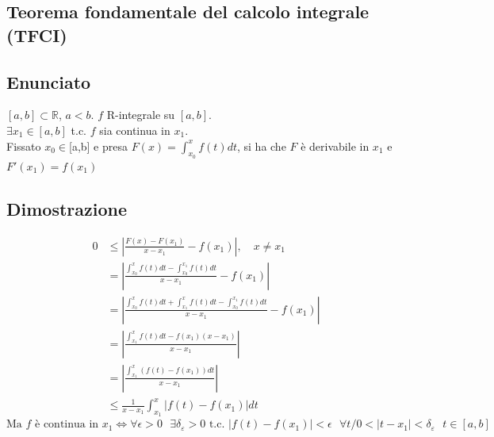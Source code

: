 \documentclass{article}
\newcommand{\R}{\mathbb{R}}
\newcommand{\DeltaEp}{\delta_{\varepsilon}} %
\newcommand{\vSpace}{\vspace{1em}}
\begin{document}
\begin{flushleft}
\section{Teorema fondamentale del calcolo integrale (TFCI)} \label{TFCI}
\subsection{Enunciato}
$[a,b] \subset \R$, $a < b$. $f$ R-integrale su $[a,b]$.
\\$\exists x_1 \in [a,b]$ t.c. $f$ sia continua in $x_1$.
\\Fissato $x_0 \in $[a,b] e presa $F(x) = \int_{x_0}^{x}f(t)dt$, si ha che $F$ è derivabile in $x_1$ e $F'(x_1)=f(x_1)$
\subsection{Dimostrazione}

\begin{align*}
    0 &\leq \left| \frac{F(x) - F(x_1)}{x - x_1} - f(x_1) \right|, \quad x \neq x_1 \\
    &= \left| \frac{\int_{x_0}^{x} f(t) dt - \int_{x_0}^{x_1} f(t) dt}{x - x_1} - f(x_1) \right| \\
    &= \left| \frac{\int_{x_0}^{x} f(t) dt + \int_{x_1}^{x} f(t) dt - \int_{x_0}^{x_1} f(t) dt}{x - x_1} - f(x_1) \right| \\
    &= \left| \frac{\int_{x_1}^{x} f(t) dt - f(x_1)(x - x_1)}{x - x_1} \right| \\
    &= \left| \frac{\int_{x_1}^{x} (f(t) - f(x_1)) dt}{x - x_1} \right| \\
    &\leq \frac{1}{x - x_1} \int_{x_1}^{x} |f(t) - f(x_1)| dt
\end{align*}
\vSpace
\[ 
  \text{Ma } f \text{ è continua in }x_1 \iff \forall\epsilon>0\text{ }\exists \DeltaEp>0\text{ t.c. }\left|f(t) - f(x_1)\right|<\epsilon\text{ }\forall t / 0 < \left|t-x_1\right|<\DeltaEp\text{ }t\in[a,b]
\]


\end{flushleft}
\end{document}
